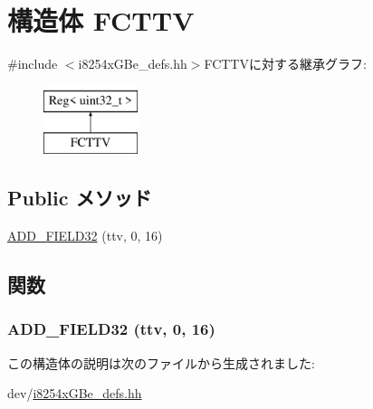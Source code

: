 \hypertarget{structiGbReg_1_1Regs_1_1FCTTV}{
\section{構造体 FCTTV}
\label{structiGbReg_1_1Regs_1_1FCTTV}
}


{\ttfamily \#include $<$i8254xGBe\_\-defs.hh$>$}FCTTVに対する継承グラフ:\begin{figure}[H]
\begin{center}
\leavevmode
\includegraphics[height=2cm]{structiGbReg_1_1Regs_1_1FCTTV}
\end{center}
\end{figure}
\subsection*{Public メソッド}
\begin{DoxyCompactItemize}
\item 
\hyperlink{structiGbReg_1_1Regs_1_1FCTTV_a64e4c8cbb200b4d2d2649a333f4a65b3}{ADD\_\-FIELD32} (ttv, 0, 16)
\end{DoxyCompactItemize}


\subsection{関数}
\hypertarget{structiGbReg_1_1Regs_1_1FCTTV_a64e4c8cbb200b4d2d2649a333f4a65b3}{
\subsubsection[{ADD\_\-FIELD32}]{\setlength{\rightskip}{0pt plus 5cm}ADD\_\-FIELD32 (ttv, \/  0, \/  16)}}
\label{structiGbReg_1_1Regs_1_1FCTTV_a64e4c8cbb200b4d2d2649a333f4a65b3}


この構造体の説明は次のファイルから生成されました:\begin{DoxyCompactItemize}
\item 
dev/\hyperlink{i8254xGBe__defs_8hh}{i8254xGBe\_\-defs.hh}\end{DoxyCompactItemize}
